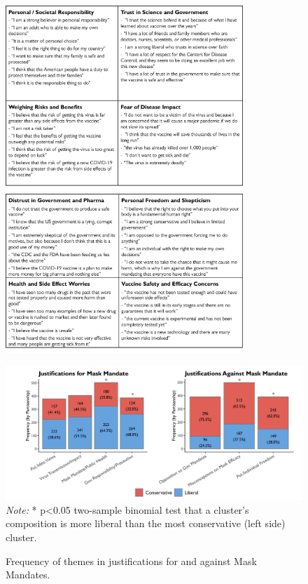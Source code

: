 \documentclass{article}
\begin{document}
\begin{figure}[!htbp]
  \captionsetup{justification=raggedright,singlelinecheck=false}
  \label{tab:table1}
  \centering
  \includegraphics[width=0.8\textwidth]{./figures/media/Table1.png}

  \vspace{1cm}

  \label{tab:table2}
  \centering
  \includegraphics[width=0.8\textwidth]{./figures/media/Table2.png}
\end{figure}

\begin{figure}[H]
  \captionsetup{justification=raggedright,singlelinecheck=false}
  \caption{Frequency of themes in justifications for and against Mask Mandates.}
  \label{fig:partisan6}
  \centering
  \includegraphics[width=\textwidth]{./figures/media/image10.png}
  \smallskip 
  \small
  \\ \textit{Note:} * p\textless0.05 two-sample binomial test that a cluster's composition is more liberal than the most conservative (left side) cluster.
\end{figure}
\end{document}
